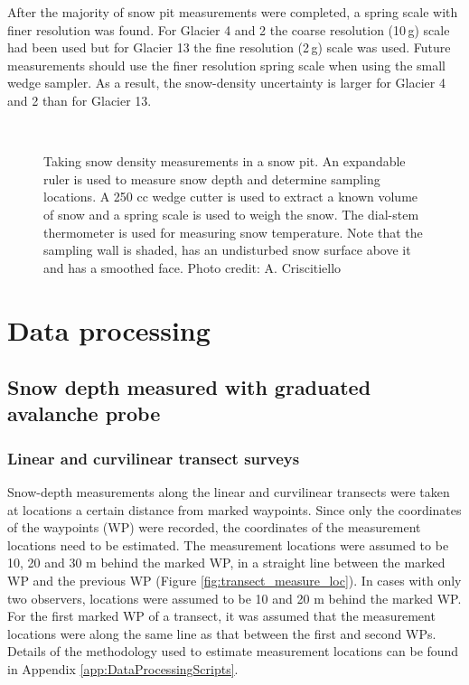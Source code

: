 \documentclass{sfuthesis}
\begin{document}
After the majority of snow pit measurements were completed, a spring scale with finer resolution was found. For Glacier 4 and 2 the coarse resolution (10\,g) scale had been used but for Glacier 13 the fine resolution (2\,g) scale was used. Future measurements should use the finer resolution spring scale when using the small wedge sampler. As a result, the snow-density uncertainty is larger for Glacier 4 and 2 than for Glacier 13. 

\begin{figure}[H]
	\centering
	\\
	\caption[Taking snow density measurements in a snow pit.]{Taking snow density measurements in a snow pit. An expandable ruler is used to measure snow depth and determine sampling locations. A 250 cc wedge cutter is used to extract a known volume of snow and a spring scale is used to weigh the snow. The dial-stem thermometer is used for measuring snow temperature. Note that the sampling wall is shaded, has an undisturbed snow surface above it and has a smoothed face. Photo credit: A. Criscitiello}
	\label{photo_snowpit}
	\end{figure}

\section{Data processing}
\subsection{Snow depth measured with graduated avalanche probe}

\subsubsection{Linear and curvilinear transect surveys}

Snow-depth measurements along the linear and curvilinear transects were taken at locations a certain distance from marked waypoints. Since only the coordinates of the waypoints (WP) were recorded, the coordinates of the measurement locations need to be estimated. The measurement locations were assumed to be 10, 20 and 30 m behind the marked WP, in a straight line between the marked WP and the previous WP (Figure \ref{fig:transect_measure_loc}). In cases with only two observers, locations were assumed to be 10 and 20 m behind the marked WP. For the first marked WP of a transect, it was assumed that the measurement locations were along the same line as that between the first and second WPs. Details of the methodology used to estimate measurement locations can be found in Appendix \ref{app:DataProcessingScripts}.
\end{document}
